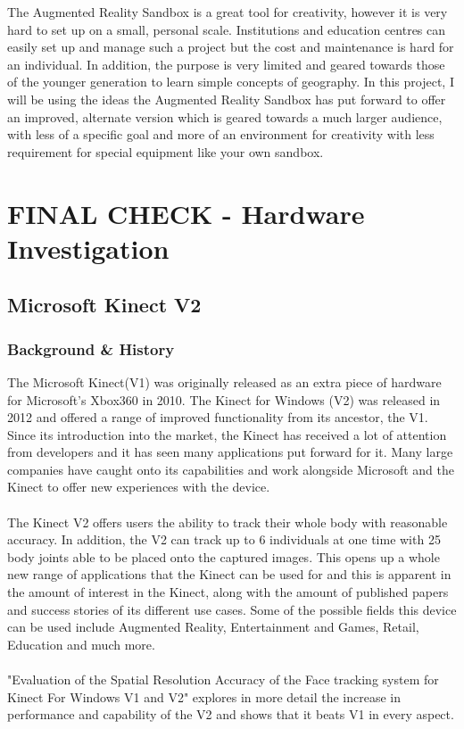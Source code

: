 \documentclass[11pt]{article}
\begin{document}
The Augmented Reality Sandbox is a great tool for creativity, however it is very hard to set up
on a small, personal scale. Institutions and education centres can easily set
up and manage such a project but the cost and maintenance is hard for an
individual. In addition, the purpose is very limited and geared towards those
of the younger generation to learn simple concepts of geography. In this project,
I will be using the ideas the Augmented Reality Sandbox has put forward to offer an
improved, alternate version which is geared towards a much larger audience, with
less of a specific goal and more of an environment for creativity with less
requirement for special equipment like your own sandbox.

\section{FINAL CHECK - Hardware Investigation}
\subsection{Microsoft Kinect V2}
\subsubsection{Background \& History}
The Microsoft Kinect(V1) was originally released as an extra piece of hardware
for Microsoft's Xbox360 in 2010. The Kinect for Windows (V2) was released
in 2012 and offered a range of improved functionality from its ancestor, the
V1. Since its introduction into the market, the Kinect has received a lot of
attention from developers and it has seen many applications put forward for 
it. Many large companies have caught onto its capabilities and work 
alongside Microsoft and the Kinect to offer new experiences with the device.\\ 
\\
The Kinect V2 offers users the ability to track their
whole body with reasonable accuracy. In addition, the V2 can track up to 6 individuals
at one time with 25 body joints able to be placed onto the captured images.
This opens up a whole new range of applications
that the Kinect can be used for and this is apparent in the amount of interest in the
Kinect, along with the amount of published papers and success stories of 
its different use cases.
Some of the possible fields this device can be used include 
Augmented Reality, Entertainment and Games, Retail, Education and much more.\\
\\ 
"Evaluation of the Spatial Resolution Accuracy of the Face 
tracking system for Kinect For Windows V1 and V2" \cite{AmonFuhrmann14}
explores in more detail the increase in performance and capability
of the V2 and shows that it beats V1 in every aspect. 
\end{document}
